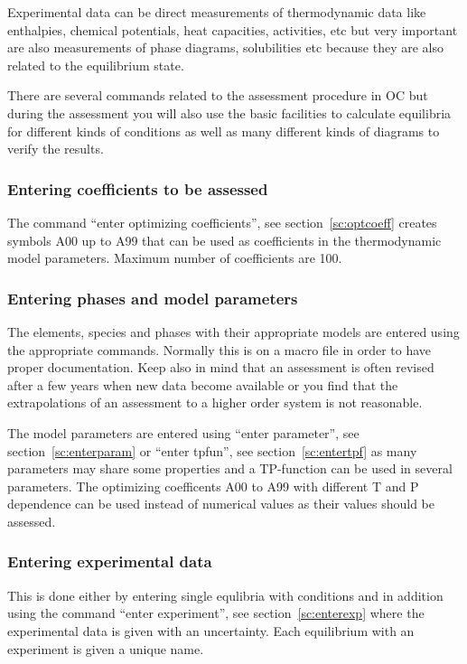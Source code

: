 \documentclass[11pt]{article}
\begin{document}
Experimental data can be direct measurements of thermodynamic data
like enthalpies, chemical potentials, heat capacities, activities, etc
but very important are also measurements of phase diagrams,
solubilities etc because they are also related to the equilibrium
state.

There are several commands related to the assessment procedure in OC
but during the assessment you will also use the basic facilities to
calculate equilibria for different kinds of conditions as well as many
different kinds of diagrams to verify the results.

\subsubsection{Entering coefficients to be assessed}

The command ``enter optimizing coefficients'', see
section~\ref{sc:optcoeff} creates symbols A00 up to A99 that can be
used as coefficients in the thermodynamic model parameters.  Maximum
number of coefficients are 100.

\subsubsection{Entering phases and model parameters}

The elements, species and phases with their appropriate models are
entered using the appropriate commands.  Normally this is on a macro
file in order to have proper documentation.  Keep also in mind that an
assessment is often revised after a few years when new data become
available or you find that the extrapolations of an assessment to a
higher order system is not reasonable.

The model parameters are entered using ``enter parameter'', see
section~\ref{sc:enterparam} or ``enter tpfun'', see
section~\ref{sc:entertpf} as many parameters may share some properties
and a TP-function can be used in several parameters.  The optimizing
coefficents A00 to A99 with different T and P dependence can be used
instead of numerical values as their values should be assessed.

\subsubsection{Entering experimental data}

This is done either by entering single equlibria with conditions and
in addition using the command ``enter experiment'', see
section~\ref{sc:enterexp} where the experimental data is given with an
uncertainty.  Each equilibrium with an experiment is given a unique
name.
\end{document}
